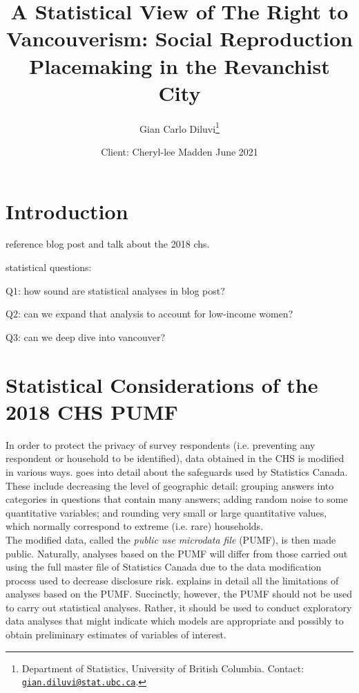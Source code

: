 \documentclass[11pt]{article}
\title{\vspace{-2cm}\Large A Statistical View of The Right to Vancouverism: Social Reproduction Placemaking in the Revanchist City}
\author{\normalsize Gian Carlo Diluvi\footnote{Department of Statistics, University of British Columbia. Contact: \href{mailto:gian.diluvi@stat.ubc.ca}{\texttt{gian.diluvi@stat.ubc.ca}}.}}
\date{\normalsize Client: Cheryl-lee Madden
\vskip 0.1cm
June 2021}
\begin{document}
\maketitle





\section{Introduction}

reference blog post and talk about the 2018 chs.

statistical questions:

Q1: how sound are statistical analyses in blog post?

Q2: can we expand that analysis to account for low-income women?

Q3: can we deep dive into vancouver?







\section{Statistical Considerations of the 2018 CHS PUMF} \label{sec:stats}


In order to protect the privacy of survey respondents (i.e.
preventing any respondent or household to be identified), data obtained
in the CHS is modified in various ways. \cite[Section~6]{chsguide} goes
into detail about the safeguards used by Statistics Canada. These include
decreasing the level of geographic detail; grouping answers into
categories in questions that contain many answers; adding random noise to
some quantitative variables; and rounding very small or large quantitative
values, which normally correspond to extreme (i.e. rare) households.
\\


The modified data, called the \textit{public use microdata file} (PUMF),
is then made public. Naturally, analyses based on the PUMF will differ from
those carried out using the full master file of Statistics Canada due
to the data modification process used to decrease disclosure risk.
\cite[Section~7]{chsguide} explains in detail all the limitations of analyses
based on the PUMF. Succinctly, however, the PUMF should not be used to carry out
statistical analyses. Rather, it should be used to conduct exploratory data
analyses that might indicate which models are appropriate and possibly
to obtain preliminary estimates of variables of interest.
\\
\end{document}
